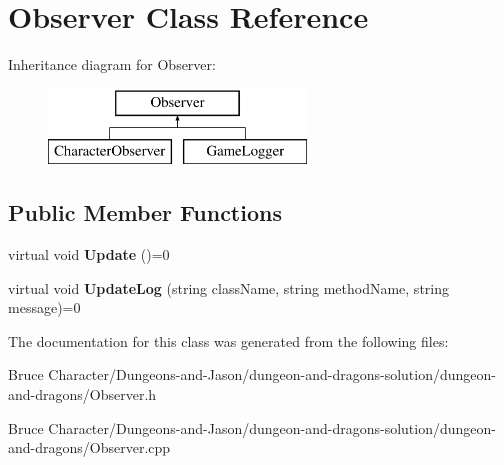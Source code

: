 \hypertarget{class_observer}{}\section{Observer Class Reference}
\label{class_observer}
Inheritance diagram for Observer\+:\begin{figure}[H]
\begin{center}
\leavevmode
\includegraphics[height=2.000000cm]{class_observer}
\end{center}
\end{figure}
\subsection*{Public Member Functions}
\begin{DoxyCompactItemize}
\item 
\hypertarget{class_observer_a3c7c1dd5ca0f7bdb0e05098d1b7aac41}{}\label{class_observer_a3c7c1dd5ca0f7bdb0e05098d1b7aac41} 
virtual void {\bfseries Update} ()=0
\item 
\hypertarget{class_observer_a22ed871dd536d671a8e1bcc68c090a57}{}\label{class_observer_a22ed871dd536d671a8e1bcc68c090a57} 
virtual void {\bfseries Update\+Log} (string class\+Name, string method\+Name, string message)=0
\end{DoxyCompactItemize}


The documentation for this class was generated from the following files\+:\begin{DoxyCompactItemize}
\item 
Bruce Character/\+Dungeons-\/and-\/\+Jason/dungeon-\/and-\/dragons-\/solution/dungeon-\/and-\/dragons/Observer.\+h\item 
Bruce Character/\+Dungeons-\/and-\/\+Jason/dungeon-\/and-\/dragons-\/solution/dungeon-\/and-\/dragons/Observer.\+cpp\end{DoxyCompactItemize}

